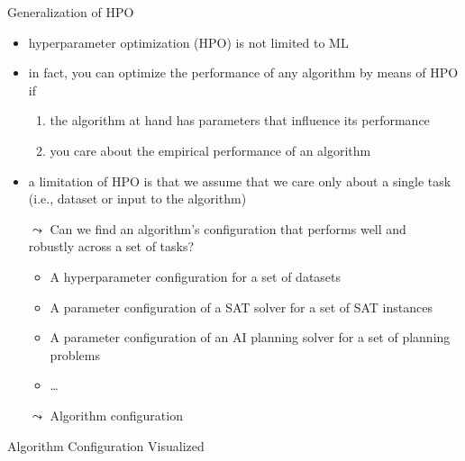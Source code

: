 \begin{frame}[c]{Generalization of HPO}

\begin{itemize}
	\item hyperparameter optimization (HPO) is not limited to ML
	\pause
	\item in fact, you can optimize the performance of any algorithm by means of HPO if
	\begin{enumerate}
		\pause
		\item the algorithm at hand has parameters that influence its performance
		\pause
		\item you care about the empirical performance of an algorithm
	\end{enumerate}
	\pause
	\smallskip
	\item a limitation of HPO is that we assume that we care only about a single task\\ (i.e., dataset or input to the algorithm)
	\smallskip
	\pause
	\item[$\leadsto$] \alert{Can we find an algorithm's configuration that performs well and\\ robustly across a set of tasks?}
	\begin{itemize}
		\pause
		\item A hyperparameter configuration for a set of datasets
		\pause
		\item A parameter configuration of a SAT solver for a set of SAT instances
		\pause
		\item A parameter configuration of an AI planning solver for a set of planning problems
		\item \ldots
	\end{itemize}
	\pause
	\item[$\leadsto$] \alert{Algorithm configuration}
\end{itemize}


\end{frame}
\begin{frame}[c]{Algorithm Configuration Visualized}

\centering
{}

\end{frame}
